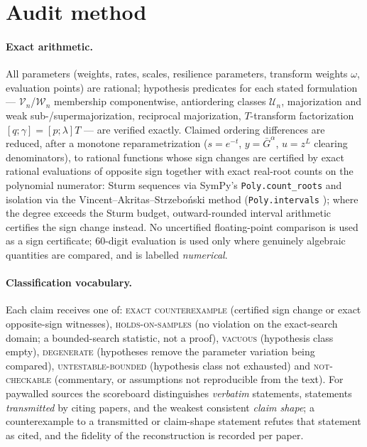 \documentclass[10pt]{article}
\theoremstyle{plain}
\theoremstyle{definition}
\theoremstyle{remark}
\newcommand{\Vn}{\mathcal V_n}
\newcommand{\Wn}{\mathcal W_n}
\begin{document}
\section{Audit method}\label{sec:method}

\paragraph{Exact arithmetic.} All parameters (weights, rates, scales, resilience parameters, transform weights $\omega$, evaluation points) are rational; hypothesis predicates for each stated formulation --- $\Vn$/$\Wn$ membership componentwise, antiordering classes $\mathcal U_n$, majorization and weak sub-/supermajorization, reciprocal majorization, $T$-transform factorization $[q;\gamma]=[p;\lambda]T$ --- are verified exactly. Claimed ordering differences are reduced, after a monotone reparametrization ($s=e^{-t}$, $y=\bar G^\alpha$, $u=z^L$ clearing denominators), to rational functions whose sign changes are certified by exact rational evaluations of opposite sign together with exact real-root counts on the polynomial numerator: Sturm sequences via SymPy's \texttt{Poly.count\_roots} \cite{Meurer2017,BasuPollackRoy2006} and isolation via the Vincent--Akritas--Strzebo\'nski method (\texttt{Poly.intervals} \cite{AkritasStrzebonski2005}); where the degree exceeds the Sturm budget, outward-rounded interval arithmetic certifies the sign change instead. No uncertified floating-point comparison is used as a sign certificate; $60$-digit evaluation is used only where genuinely algebraic quantities are compared, and is labelled \emph{numerical}.

\paragraph{Classification vocabulary.} Each claim receives one of: \textsc{exact counterexample} (certified sign change or exact opposite-sign witnesses), \textsc{holds-on-samples} (no violation on the exact-search domain; a bounded-search statistic, not a proof), \textsc{vacuous} (hypothesis class empty), \textsc{degenerate} (hypotheses remove the parameter variation being compared), \textsc{untestable-bounded} (hypothesis class not exhausted) and \textsc{not-checkable} (commentary, or assumptions not reproducible from the text). For paywalled sources the scoreboard distinguishes \emph{verbatim} statements, statements \emph{transmitted} by citing papers, and the weakest consistent \emph{claim shape}; a counterexample to a transmitted or claim-shape statement refutes that statement as cited, and the fidelity of the reconstruction is recorded per paper.
\end{document}
